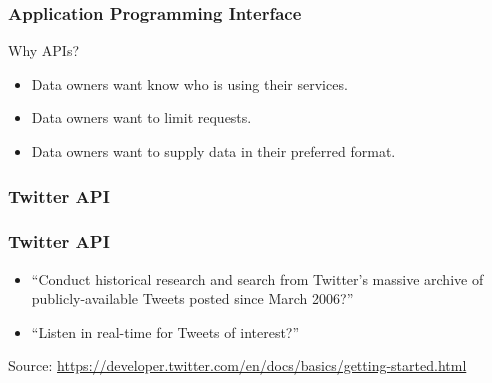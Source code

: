 
\begin{frame}
    \frametitle{Application Programming Interface}

    Why APIs?

    \begin{itemize}
        \item Data owners want know who is using their services.
        \item Data owners want to limit requests.
        \item Data owners want to supply data in their preferred format.
    \end{itemize}
\end{frame}

\subsubsection*{Twitter API}
\label{sec:twitter-api}

\begin{frame}
    \frametitle{Twitter API}
    \begin{itemize}
        \item ``Conduct historical research and search from Twitter's
        massive archive of publicly-available Tweets posted since
        March 2006?''
        \item ``Listen in real-time for Tweets of interest?''
    \end{itemize}
    Source: \href{https://developer.twitter.com/en/docs/basics/getting-started.html}{https://developer.twitter.com/en/docs/basics/getting-started.html}
\end{frame}

